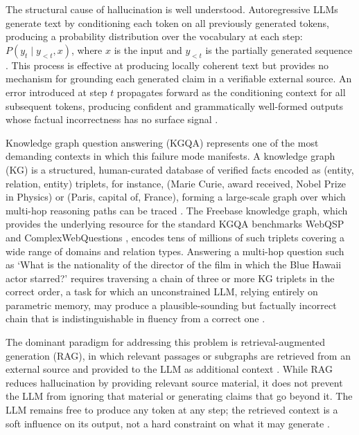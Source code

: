 The structural cause of hallucination is well understood. Autoregressive LLMs generate text by conditioning each token on all previously generated tokens, producing a probability distribution over the vocabulary at each step: $P(y_t \mid y_{<t}, x)$, where $x$ is the input and $y_{<t}$ is the partially generated sequence \citep{brown2020gpt3}. This process is effective at producing locally coherent text but provides no mechanism for grounding each generated claim in a verifiable external source. An error introduced at step $t$ propagates forward as the conditioning context for all subsequent tokens, producing confident and grammatically well-formed outputs whose factual incorrectness has no surface signal \citep{huang2023survey,ji2023survey}.

Knowledge graph question answering (KGQA) represents one of the most demanding contexts in which this failure mode manifests. A knowledge graph (KG) is a structured, human-curated database of verified facts encoded as (entity, relation, entity) triplets, for instance, (Marie Curie, award received, Nobel Prize in Physics) or (Paris, capital of, France), forming a large-scale graph over which multi-hop reasoning paths can be traced \citep{bollacker2008freebase}. The Freebase knowledge graph, which provides the underlying resource for the standard KGQA benchmarks WebQSP \citep{yih2016value} and ComplexWebQuestions \citep{talmor2018web}, encodes tens of millions of such triplets covering a wide range of domains and relation types. Answering a multi-hop question such as `What is the nationality of the director of the film in which the Blue Hawaii actor starred?' requires traversing a chain of three or more KG triplets in the correct order, a task for which an unconstrained LLM, relying entirely on parametric memory, may produce a plausible-sounding but factually incorrect chain that is indistinguishable in fluency from a correct one \citep{lan2022survey,he2021improving}.

The dominant paradigm for addressing this problem is retrieval-augmented generation (RAG), in which relevant passages or subgraphs are retrieved from an external source and provided to the LLM as additional context \citep{lewis2020retrieval,izacard2021leveraging}. While RAG reduces hallucination by providing relevant source material, it does not prevent the LLM from ignoring that material or generating claims that go beyond it. The LLM remains free to produce any token at any step; the retrieved context is a soft influence on its output, not a hard constraint on what it may generate \citep{asai2024selfrag,agrawal2024mindfulrag}.

